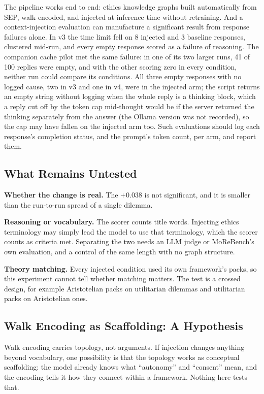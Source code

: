 \documentclass[11pt,a4paper]{article}
\begin{document}
The pipeline works end to end: ethics knowledge graphs built automatically from SEP, walk-encoded, and injected at inference time without retraining. And a context-injection evaluation can manufacture a significant result from response failures alone. In v3 the time limit fell on 8 injected and 3 baseline responses, clustered mid-run, and every empty response scored as a failure of reasoning. The companion cache pilot \citep{nexus2026kv} met the same failure: in one of its two larger runs, 41 of 100 replies were empty, and with the other scoring zero in every condition, neither run could compare its conditions. All three empty responses with no logged cause, two in v3 and one in v4, were in the injected arm; the script returns an empty string without logging when the whole reply is a thinking block, which a reply cut off by the token cap mid-thought would be if the server returned the thinking separately from the answer (the Ollama version was not recorded), so the cap may have fallen on the injected arm too. Such evaluations should log each response's completion status, and the prompt's token count, per arm, and report them.

\subsection{What Remains Untested}
\label{sec:untested}

\textbf{Whether the change is real.} The $+$0.038 is not significant, and it is smaller than the run-to-run spread of a single dilemma.

\textbf{Reasoning or vocabulary.} The scorer counts title words. Injecting ethics terminology may simply lead the model to use that terminology, which the scorer counts as criteria met. Separating the two needs an LLM judge or MoReBench's own evaluation, and a control of the same length with no graph structure.

\textbf{Theory matching.} Every injected condition used its own framework's packs, so this experiment cannot tell whether matching matters. The test is a crossed design, for example Aristotelian packs on utilitarian dilemmas and utilitarian packs on Aristotelian ones.

\subsection{Walk Encoding as Scaffolding: A Hypothesis}

Walk encoding carries topology, not arguments. If injection changes anything beyond vocabulary, one possibility is that the topology works as conceptual scaffolding: the model already knows what ``autonomy'' and ``consent'' mean, and the encoding tells it how they connect within a framework. Nothing here tests that.
\end{document}
